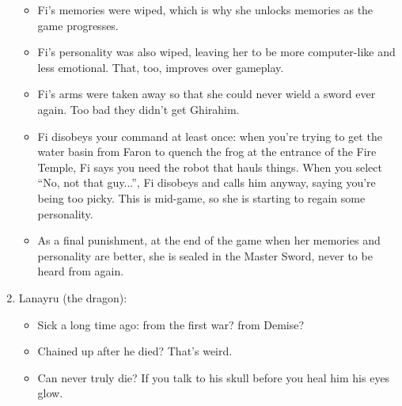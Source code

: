 \begin{enumerate}
{\begin{itemize}
			\item{Fi's memories were wiped, which is why she unlocks memories as the game progresses.}
			\item{Fi's personality was also wiped, leaving her to be more computer-like and less emotional. That, too, improves over gameplay.}
			\item{Fi's arms were taken away so that she could never wield a sword ever again. Too bad they didn't get Ghirahim.}
			\item{Fi disobeys your command at least once: when you're trying to get the water basin from Faron to quench the frog at the entrance of the Fire Temple, Fi says you need the robot that hauls things. When you select ``No, not that guy...'', Fi disobeys and calls him anyway, saying you're being too picky. This is mid-game, so she is starting to regain some personality.}
			\item{As a final punishment, at the end of the game when her memories and personality are better, she is sealed in the Master Sword, never to be heard from again.}
		\end{itemize}
	}
	\item{Lanayru (the dragon):
		\begin{itemize}
			\item{Sick a long time ago: from the first war? from Demise?}
			\item{Chained up after he died? That's weird.}
			\item{Can never truly die? If you talk to his skull before you heal him his eyes glow.}
		\end{itemize}
		}
		

\end{enumerate}
